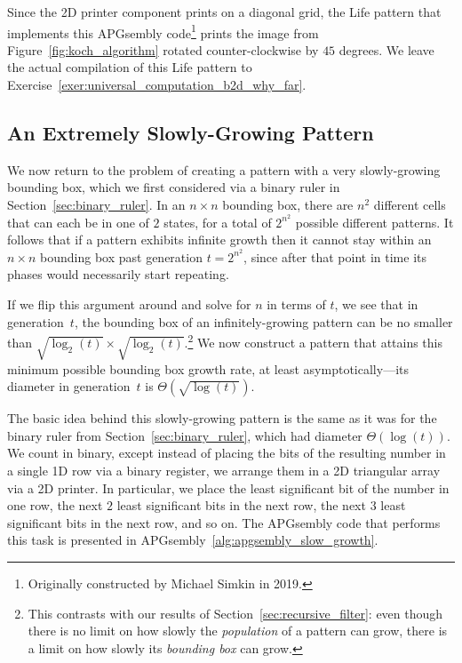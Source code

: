 Since the 2D printer component prints on a diagonal grid, the Life pattern that implements this APGsembly code\footnote{Originally constructed by Michael Simkin in 2019.} prints the image from Figure~\ref{fig:koch_algorithm} rotated counter-clockwise by $45$ degrees. We leave the actual compilation of this Life pattern to Exercise~\ref{exer:universal_computation_b2d_why_far}.


\subsection{An Extremely Slowly-Growing Pattern}\label{sec:Osqrtlogt}

We now return to the problem of creating a pattern with a very slowly-growing bounding box, which we first considered via a binary ruler in Section~\ref{sec:binary_ruler}. In an $n \times n$ bounding box, there are $n^2$ different cells that can each be in one of $2$ states, for a total of $2^{n^2}$ possible different patterns. It follows that if a pattern exhibits infinite growth then it cannot stay within an $n \times n$ bounding box past generation $t = 2^{n^2}$, since after that point in time its phases would necessarily start repeating.

If we flip this argument around and solve for $n$ in terms of $t$, we see that in generation~$t$, the bounding box of an infinitely-growing pattern can be no smaller than $\sqrt{\log_2(t)} \times \sqrt{\log_2(t)}$.\footnote{This contrasts with our results of Section~\ref{sec:recursive_filter}: even though there is no limit on how slowly the \emph{population} of a pattern can grow, there is a limit on how slowly its \emph{bounding box} can grow.} We now construct a pattern that attains this minimum possible bounding box growth rate, at least asymptotically---its diameter in generation~$t$ is $\Theta(\sqrt{\log(t)})$.

The basic idea behind this slowly-growing pattern is the same as it was for the binary ruler from Section~\ref{sec:binary_ruler}, which had diameter $\Theta(\log(t))$. We count in binary, except instead of placing the bits of the resulting number in a single 1D row via a binary register, we arrange them in a 2D triangular array via a 2D printer. In particular, we place the least significant bit of the number in one row, the next $2$ least significant bits in the next row, the next $3$ least significant bits in the next row, and so on. The APGsembly code that performs this task is presented in APGsembly~\ref{alg:apgsembly_slow_growth}.

